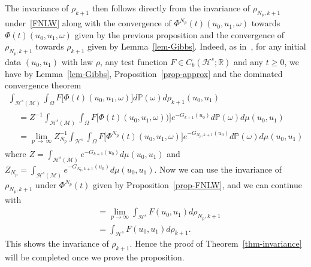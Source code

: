 \documentclass[10pt]{amsart}
\theoremstyle{definition}\newtheorem{defi}[theo]{Definition}\newtheorem{rema}[theo]{Remark}\newtheorem{exam}[theo]{Example}\newtheorem{exem}[theo]{Example}\newtheorem{nota}[theo]{Notation}
\newcommand{\R}{\mathbb{R}}
\newcommand{\Prob}{\mathbb{P}}
\newcommand{\M}{\mathcal{M}}
\renewcommand{\H}{\mathcal{H}}
\newcommand{\ZZ}{Z}
\renewcommand{\o}{\omega}
\renewcommand{\O}{\Omega}
\begin{document}
The invariance of $\rho_{k+1}$ then follows directly from the invariance of $\rho_{N_p,k+1}$ under~\eqref{FNLW} along with the convergence of $\Phi^{N_p}(t)(u_0,u_1,\o)$ towards $\Phi(t)(u_0,u_1,\o)$ given by the previous proposition and the convergence of $\rho_{N_p,k+1}$ towards $\rho_{k+1}$ given by Lemma~\ref{lem-Gibbs}. Indeed, as in~\cite{Tolomeo}, for any initial data $(u_0,u_1)$ with law $\rho$, any test function $F\in C_b(\H^s;\R)$ and any $t\ge 0$, we have by Lemma~\ref{lem-Gibbs}, Proposition~\ref{prop-approx} and the dominated convergence theorem
\begin{multline*}
\int_{\H^s(\M)}\int_\O F\big[\Phi(t)(u_0,u_1,\o)\big]d\Prob(\o)d\rho_{k+1}(u_0,u_1)\\
\begin{aligned}
&=\ZZ^{-1}\int_{\H^s(\M)}\int_\O F\big[\Phi(t)(u_0,u_1,\o))\big]e^{-G_{k+1}(u_0)}d\Prob(\o)d\mu(u_0,u_1)\\
&= \lim_{p\,\to\,\infty}\ZZ_{N_p}^{-1}\int_{\H^s}\int_\O F\big[\Phi^{N_p}(t)(u_0,u_1,\o)\big]e^{-G_{N_p,k+1}(u_0)}d\Prob(\o)d\mu(u_0,u_1)
\end{aligned}
\end{multline*}
where $\ZZ=\int_{\H^s(\M)}e^{-G_{k+1}(u_0)}d\mu(u_0,u_1)$ and $\ZZ_{N_p}=\int_{\H^s(\M)}e^{-G_{N_p,k+1}(u_0)}d\mu(u_0,u_1)$. Now we can use the invariance of $\rho_{N_p,k+1}$ under $\Phi^{N_p}(t)$ given by Proposition~\ref{prop-FNLW}, and we can continue with
\begin{align*}
 &=\lim_{p\to\infty}\int_{\H^s}F(u_0,u_1)d\rho_{N_p,k+1}\\
&=\int_{\H^s} F(u_0,u_1)d\rho_{k+1}.
\end{align*}
This shows the invariance of $\rho_{k+1}$. Hence the proof of Theorem~\ref{thm-invariance} will be completed once we prove the proposition.
\end{document}
